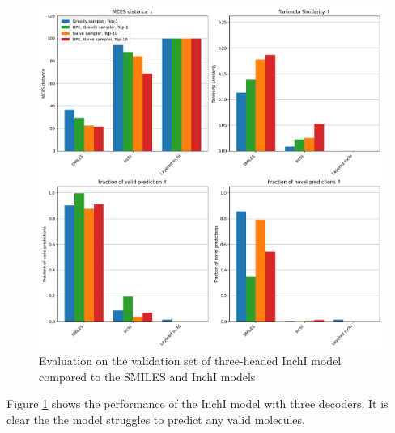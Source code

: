 \begin{figure}[H]
    \centering
    \includegraphics[width=1.0\textwidth]{figures/appendix/layered_inchi_with_tanimoto.png}
    \caption{Evaluation on the validation set of three-headed InchI model compared to the SMILES and InchI models}
    \label{fig:layered_inchi}
\end{figure}

Figure \ref{fig:layered_inchi} shows the performance of the InchI model with three decoders. It is clear the the model struggles to predict any valid molecules.